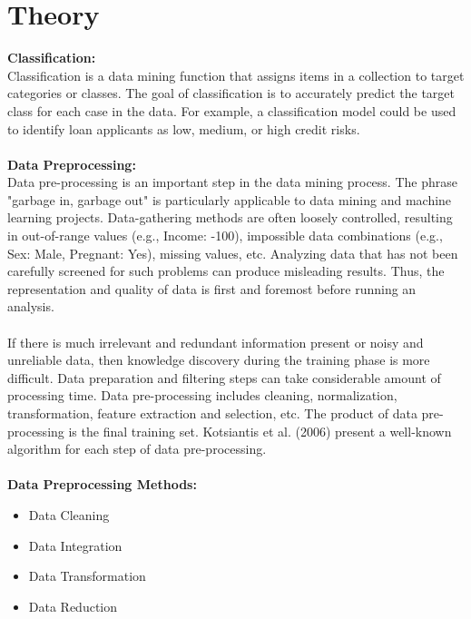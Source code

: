 \documentclass[10pt,a4paper]{article}
\begin{document}
\section{Theory}
\textbf{Classification:}
\\Classification is a data mining function that assigns items in a collection to target categories or classes. The goal of classification is to accurately predict the target class for each case in the data. For example, a classification model could be used to identify loan applicants as low, medium, or high credit risks.
\\\\
\textbf{Data Preprocessing:}
\\Data pre-processing is an important step in the data mining process. The phrase "garbage in, garbage out" is particularly applicable to data mining and machine learning projects. Data-gathering methods are often loosely controlled, resulting in out-of-range values (e.g., Income: -100), impossible data combinations (e.g., Sex: Male, Pregnant: Yes), missing values, etc. Analyzing data that has not been carefully screened for such problems can produce misleading results. Thus, the representation and quality of data is first and foremost before running an analysis.
\\\\If there is much irrelevant and redundant information present or noisy and unreliable data, then knowledge discovery during the training phase is more difficult. Data preparation and filtering steps can take considerable amount of processing time. Data pre-processing includes cleaning, normalization, transformation, feature extraction and selection, etc. The product of data pre-processing is the final training set. Kotsiantis et al. (2006) present a well-known algorithm for each step of data pre-processing.
\\\\\textbf{Data Preprocessing Methods:}
\begin{itemize}
\item Data Cleaning
\item Data Integration
\item Data Transformation
\item Data Reduction
\end{itemize}
\end{document}
